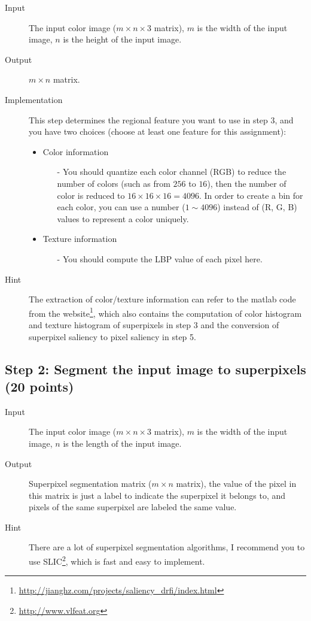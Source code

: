 \documentclass[12pt]{article}
\begin{document}
\begin{description}
\item[Input] The input color image ($m \times n \times 3$ matrix), $m$ is the width of the input image, $n$ is the height of the input image.
\item[Output] $m \times n$ matrix. 
\item[Implementation] This step determines the regional feature you want to use in step 3, and you have two choices (choose at least one feature for this assignment):
\begin{itemize}
\item Color information
\begin{itemize}
\item[-] You should quantize each color channel (RGB) to reduce the number of colors (such as from $256$ to $16$), then the number of color is reduced to $16 \times 16 \times 16 = 4096$. In order to create a bin for each color, you can use a number ($1 \sim 4096$) instead of (R, G, B) values to represent a color uniquely.
\end{itemize}
\item Texture information
\begin{itemize}
\item[-] You should compute the LBP value of each pixel here.  
\end{itemize}
\end{itemize}
\item[Hint] The extraction of color/texture information can refer to the matlab code from the website\footnote{\url{http://jianghz.com/projects/saliency_drfi/index.html}}, which also contains the computation of color histogram and texture histogram of superpixels in step 3 and the conversion of superpixel saliency to pixel saliency in step 5.
\end{description}

\subsection{Step 2: Segment the input image to superpixels (20 points)}

\begin{description}
\item[Input] The input color image ($m \times n \times 3$ matrix), $m$ is the width of the input image, $n$ is the length of the input image. 
\item[Output]  Superpixel segmentation matrix ($m \times n$ matrix), the value of the pixel in this matrix is just a label to indicate the superpixel it belongs to, and pixels of the same superpixel are labeled the same value. 
\item[Hint] There are a lot of superpixel segmentation algorithms, I recommend you to use SLIC\footnote{\url{http://www.vlfeat.org}}, which is fast and easy to implement.
\end{description}
\end{document}
